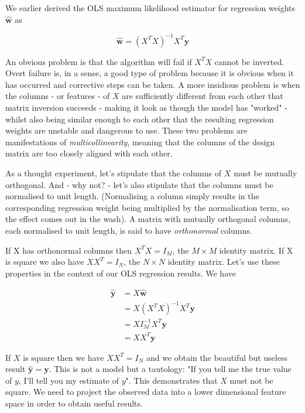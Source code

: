 \documentclass[11pt]{article}
\begin{document}
	We earlier derived the OLS maximum likelihood estimator for regression weights $\boldsymbol{\hat{w}}$ as 
	
	\begin{equation*}
		\boldsymbol{\hat{w}} = (X^{T}X)^{-1}X^{T}\boldsymbol{y}
	\end{equation*}
	
	An obvious problem is that the algorithm will fail if $X^{T}X$ cannot be inverted. Overt failure is, in a sense, a good type of problem because it is obvious when it has occurred and corrective steps can be taken. A more insidious problem is when the columns - or features - of $X$ are sufficiently different from each other that matrix inversion succeeds - making it look as though the model has "worked" - whilst also being similar enough to each other that the resulting regression weights are unstable and dangerous to use. These two problems are manifestations of \emph{multicollinearity}, meaning that the columns of the design matrix are too closely aligned with each other.
	
	As a thought experiment, let's stipulate that the columns of $X$ must be mutually orthogonal. And - why not? - let's also stipulate that the columns must be normalised to unit length. (Normalising a column simply results in the corresponding regression weight being multiplied by the normalisation term, so the effect comes out in the wash). A matrix with mutually orthogonal columns, each normalised to unit length, is said to have \emph{orthonormal} columns.
	
	If X has orthonormal columns then $X^{T}X = I_{M}$, the $M \times M$ identity matrix. If X is square we also have $XX^{T} = I_{N}$, the $N \times N$ identity matrix. Let's use these properties in the context of our OLS regression results. We have 
	
	\begin{align*}
		\boldsymbol{\hat{y}} &= X\boldsymbol{\hat{w}} \\
		&= X(X^{T}X)^{-1}X^{T}\boldsymbol{y} \\
		&= XI_{M}^{-1}X^{T}\boldsymbol{y} \\
		&= XX^{T}\boldsymbol{y}
	\end{align*}
	
	If $X$ is square then we have $XX^{T} = I_{N}$ and we obtain the beautiful but useless result $\boldsymbol{\hat{y}} = \boldsymbol{y}$. This is not a model but a tautology: "If you tell me the true value of $y$, I'll tell you my estimate of $y$". This demonstrates that $X$ must not be square. We need to project the observed data into a lower dimensional feature space in order to obtain useful results.
	
\end{document}
